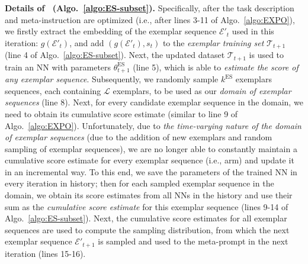 \textbf{Details of \alges~(Algo.~\ref{algo:ES-subset}).}
Specifically, after the task description and meta-instruction are optimized (i.e., after lines 3-11 of Algo.~\ref{algo:EXPO}), we firstly extract the embedding of the exemplar sequence 
$\mathcal{E}'_{t}$ 
used in this iteration: $g(\mathcal{E}'_{t})$, and add $\left(g(\mathcal{E}'_{t}), s_t\right)$ to the 
\emph{exemplar training set}
$\mathcal{T}_{t+1}$ (line 4 of Algo.~\ref{algo:ES-subset}).
Next, the updated dataset $\mathcal{T}_{t+1}$ is used to train an NN with parameters $\theta^{\text{ES}}_{t+1}$ (line 5), which is able to \emph{estimate the score of any exemplar sequence}.
Subsequently, we randomly sample $k^{\text{ES}}$ exemplars sequences, each containing $\mathcal{L}$ exemplars, to be used as our \emph{domain of exemplar sequences} (line 8). 
Next, for every candidate exemplar sequence in the domain, we need to obtain its cumulative score estimate 
(similar to line 9 of Algo.~\ref{algo:EXPO}).
Unfortunately, due to \emph{the time-varying nature of the domain of exemplar sequences} (due to the addition of new exemplars and random sampling of exemplar sequences), we are no longer able to constantly maintain a cumulative score estimate for every exemplar sequence (i.e., arm) and update it in an incremental way.
To this end, we save the parameters of the trained NN in every iteration in history; then for each sampled exemplar sequence in the domain, we obtain its score estimates from all NNs in the history and use their sum as the \emph{cumulative score estimate} for this exemplar sequence (lines 9-14 of Algo.~\ref{algo:ES-subset}).
Next, the cumulative score estimates for all exemplar sequences are used to compute the sampling distribution, from which the next exemplar sequence $\mathcal{E}'_{t+1}$ is sampled and used to the meta-prompt in the next iteration (lines 15-16).




